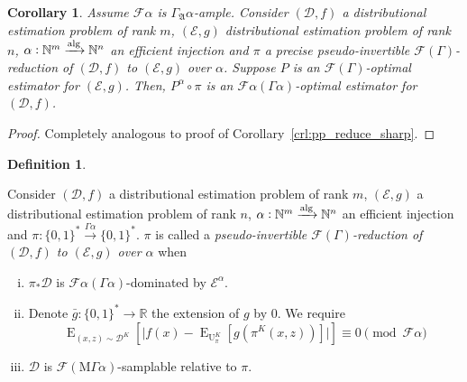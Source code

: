 \documentclass{article}
\numberwithin{equation}{section}
\theoremstyle{definition}
\newtheorem{definition}{Definition}[section]
\theoremstyle{plain}
\newtheorem{corollary}{Corollary}[section]
\newcommand{\Bool}{\{0,1\}}
\newcommand{\Words}{{\Bool^*}}
\DeclareMathOperator{\E}{E}
\DeclareMathOperator{\Un}{U}
\newcommand{\Nats}{\mathbb{N}}
\newcommand{\Reals}{\mathbb{R}}
\newcommand{\Abs}[1]{\lvert #1 \rvert}
\newcommand{\Dist}{\mathcal{D}}
\newcommand{\GrowA}{\Gamma_{\mathfrak{A}}}
\newcommand{\MGrow}{\mathrm{M}\Gamma}
\newcommand{\Fall}{\mathcal{F}}
\newcommand{\EG}{\Fall(\Gamma)}
\newcommand{\Alg}{\xrightarrow{\textnormal{alg}}}
\begin{document}
\begin{samepage}
\begin{corollary}

Assume ${\Fall \alpha}$ is ${\GrowA \alpha}$-ample. Consider $(\Dist,f)$ a distributional estimation problem of rank ${m}$, $(\mathcal{E},g)$ distributional estimation problem of rank ${n}$, ${\alpha: \Nats^m \Alg \Nats^n}$ an efficient injection and $\pi$ a precise pseudo-invertible $\EG$-reduction of $(\Dist, f)$ to $(\mathcal{E}, g)$ over ${\alpha}$. Suppose $P$ is an $\EG$-optimal estimator for $(\mathcal{E}, g)$. Then, $P^\alpha \circ \pi$ is an $\Fall \alpha (\Gamma \alpha)$-optimal estimator for $(\Dist, f)$.

\end{corollary}
\end{samepage}

\begin{proof}

Completely analogous to proof of Corollary~\ref{crl:pp_reduce_sharp}.
%
\end{proof}

\begin{samepage}
\begin{definition}
\label{def:p_reduce}

Consider $(\Dist,f)$ a distributional estimation problem of rank ${m}$, $(\mathcal{E},g)$ a distributional estimation problem of rank ${n}$, ${\alpha: \Nats^m \Alg \Nats^n}$ an efficient injection and ${\pi: \Words \xrightarrow{\Gamma \alpha} \Words}$. $\pi$ is called a \emph{pseudo-invertible $\EG$-reduction of $(\Dist,f)$ to $(\mathcal{E},g)$ over ${\alpha}$} when

\begin{enumerate}[(i)]

\item\label{con:def__p_reduce__dist} ${\pi_*\Dist}$ is ${\Fall \alpha(\Gamma \alpha)}$-dominated by ${\mathcal{E}^\alpha}$.

\item\label{con:def__p_reduce__fun} Denote ${\bar{g}: \Words \rightarrow \Reals}$ the extension of $g$ by 0. We require \[\E_{(x,z) \sim \Dist^{K}}[\Abs{f(x)-\E_{\Un_\pi^{K}}[g(\pi^{K}(x,z))]}] \equiv 0 \pmod{\Fall \alpha}\]

\item\label{con:def__p_reduce__smp} $\Dist$ is $\Fall(\MGrow \alpha)$-samplable relative to $\pi$.

\end{enumerate}

\end{definition}
\end{samepage}
\end{document}
